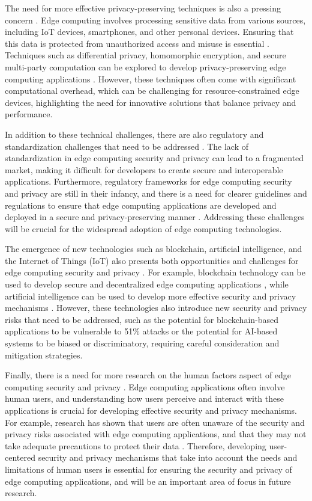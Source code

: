 \documentclass[11pt]{article}
\begin{document}
The need for more effective privacy-preserving techniques is also a pressing concern \cite{ref109}. Edge computing involves processing sensitive data from various sources, including IoT devices, smartphones, and other personal devices. Ensuring that this data is protected from unauthorized access and misuse is essential \cite{ref94}. Techniques such as differential privacy, homomorphic encryption, and secure multi-party computation can be explored to develop privacy-preserving edge computing applications \cite{ref110}. However, these techniques often come with significant computational overhead, which can be challenging for resource-constrained edge devices, highlighting the need for innovative solutions that balance privacy and performance.

In addition to these technical challenges, there are also regulatory and standardization challenges that need to be addressed \cite{ref111}. The lack of standardization in edge computing security and privacy can lead to a fragmented market, making it difficult for developers to create secure and interoperable applications. Furthermore, regulatory frameworks for edge computing security and privacy are still in their infancy, and there is a need for clearer guidelines and regulations to ensure that edge computing applications are developed and deployed in a secure and privacy-preserving manner \cite{ref112}. Addressing these challenges will be crucial for the widespread adoption of edge computing technologies.

The emergence of new technologies such as blockchain, artificial intelligence, and the Internet of Things (IoT) also presents both opportunities and challenges for edge computing security and privacy \cite{ref113}. For example, blockchain technology can be used to develop secure and decentralized edge computing applications \cite{ref38}, while artificial intelligence can be used to develop more effective security and privacy mechanisms \cite{ref40}. However, these technologies also introduce new security and privacy risks that need to be addressed, such as the potential for blockchain-based applications to be vulnerable to 51\% attacks or the potential for AI-based systems to be biased or discriminatory, requiring careful consideration and mitigation strategies.

Finally, there is a need for more research on the human factors aspect of edge computing security and privacy \cite{ref114}. Edge computing applications often involve human users, and understanding how users perceive and interact with these applications is crucial for developing effective security and privacy mechanisms. For example, research has shown that users are often unaware of the security and privacy risks associated with edge computing applications, and that they may not take adequate precautions to protect their data \cite{ref115}. Therefore, developing user-centered security and privacy mechanisms that take into account the needs and limitations of human users is essential for ensuring the security and privacy of edge computing applications, and will be an important area of focus in future research.
\end{document}
